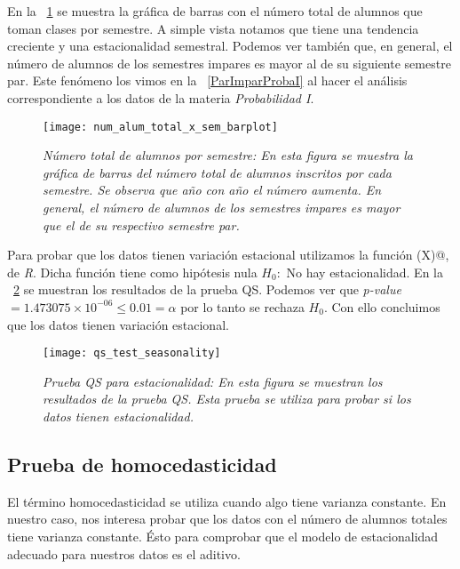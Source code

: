 En la \figurename{~\ref{TotalAlumBarras}} se muestra la gráfica de barras con el número total de alumnos que toman clases por semestre. A simple vista notamos que tiene una tendencia creciente y una estacionalidad semestral. Podemos ver también que, en general, el número de alumnos de los semestres impares es mayor al de su siguiente semestre par. Este fenómeno los vimos en la \figurename{~\ref{ParImparProbaI}} al hacer el análisis correspondiente a los datos de la materia \textit{Probabilidad I}.

\begin{figure}[H]
\centering
\texttt{[image: num\_alum\_total\_x\_sem\_barplot]} %
\caption[\textit{Número total de alumnos por semestre}]{\textit{Número total de alumnos por semestre: En esta figura se muestra la gráfica de barras del número total de alumnos inscritos por cada semestre. Se observa que año con año el número aumenta. En general, el número de alumnos de los semestres impares es mayor que el de su respectivo semestre par.}}\label{TotalAlumBarras}
\end{figure}


Para probar que los datos tienen variación estacional utilizamos la función \verb@qs(X)@, de \textit{R}. Dicha función tiene como hipótesis nula $H_{0}:$ No hay estacionalidad. En la \figurename{~\ref{QS_testSeasonality}} se muestran los resultados de la prueba QS. Podemos ver que \textit{p-value} $ = 1.473075 \times 10^{-06} \leqslant 0.01 = \alpha$ por lo tanto se rechaza $H_{0}$. Con ello concluimos que los datos tienen variación estacional.

\begin{figure}[H]
\centering
\texttt{[image: qs\_test\_seasonality]} %
\caption[\textit{Prueba QS para estacionalidad}]{\textit{Prueba QS para estacionalidad: En esta figura se muestran los resultados de la prueba QS. Esta prueba se utiliza para probar si los datos tienen estacionalidad.}}\label{QS_testSeasonality}
\end{figure}



\subsection{Prueba de homocedasticidad}

El término homocedasticidad se utiliza cuando algo tiene varianza constante. En nuestro caso, nos interesa probar que los datos con el número de alumnos totales tiene varianza constante. Ésto para comprobar que el modelo de estacionalidad adecuado para nuestros datos es el aditivo.

